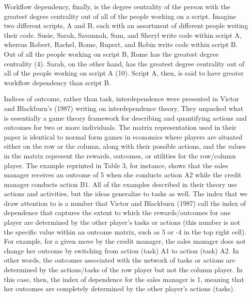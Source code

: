 \documentclass[english,,man]{apa6}
\theoremstyle{definition}
\theoremstyle{definition}
\theoremstyle{definition}
\theoremstyle{remark}
\begin{document}
Workflow dependency, finally, is the degree centrality of the person
with the greatest degree centrality out of all of the people working on
a script. Imagine two different scripts, A and B, each with an
assortment of different people writing their code. Susie, Sarah,
Savannah, Sam, and Sheryl write code within script A, whereas Robert,
Rachel, Rome, Rupert, and Robin write code within script B. Out of all
the people working on script B, Rome has the greatest degree centrality
(4). Sarah, on the other hand, has the greatest degree centrality out of
all of the people working on script A (10). Script A, then, is said to
have greater workflow dependency than script B.

Indices of outcome, rather than task, interdependence were presented in
Victor and Blackburn's (1987) writing on interdependence theory. They
unpacked what is essentially a game theory framework for describing and
quantifying actions and outcomes for two or more individuals. The matrix
representation used in their paper is identical to normal form games in
economics where players are situated either on the row or the column,
along with their possible actions, and the values in the matrix
represent the rewards, outcomes, or utilities for the row/column player.
The example reprinted in Table 3, for instance, shows that the sales
manager receives an outcome of 5 when she conducts action A2 while the
credit manager conducts action B1. All of the examples described in
their theory use actions and activities, but the ideas generalize to
tasks as well. The index that we draw attention to is a number that
Victor and Blackburn (1987) call the index of dependence that captures
the extent to which the rewards/outcomes for one player are determined
by the other player's tasks or actions (this number is not the specific
value within an outcome matrix, such as 5 or -4 in the top right cell).
For example, for a given move by the credit manager, the sales manager
does not change her outcome by switching from action (task) A1 to action
(task) A2. In other words, the outcomes associated with the network of
tasks or actions are determined by the actions/tasks of the row player
but not the column player. In this case, then, the index of dependence
for the sales manager is 1, meaning that her outcomes are completely
determined by the other player's actions (tasks).
\end{document}
